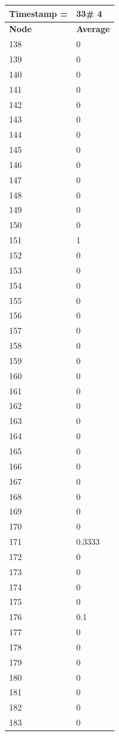 \begin{tabular}{|l||l|}
\hline
\textbf{Timestamp =} & \textbf{33}\# 4\\\hline
	\textbf{Node} & \textbf{Average} \\ \hline
\hline
	138 & 0 \\ \hline
	139 & 0 \\ \hline
	140 & 0 \\ \hline
	141 & 0 \\ \hline
	142 & 0 \\ \hline
	143 & 0 \\ \hline
	144 & 0 \\ \hline
	145 & 0 \\ \hline
	146 & 0 \\ \hline
	147 & 0 \\ \hline
	148 & 0 \\ \hline
	149 & 0 \\ \hline
	150 & 0 \\ \hline
	151 & 1 \\ \hline
	152 & 0 \\ \hline
	153 & 0 \\ \hline
	154 & 0 \\ \hline
	155 & 0 \\ \hline
	156 & 0 \\ \hline
	157 & 0 \\ \hline
	158 & 0 \\ \hline
	159 & 0 \\ \hline
	160 & 0 \\ \hline
	161 & 0 \\ \hline
	162 & 0 \\ \hline
	163 & 0 \\ \hline
	164 & 0 \\ \hline
	165 & 0 \\ \hline
	166 & 0 \\ \hline
	167 & 0 \\ \hline
	168 & 0 \\ \hline
	169 & 0 \\ \hline
	170 & 0 \\ \hline
	171 & 0.3333 \\ \hline
	172 & 0 \\ \hline
	173 & 0 \\ \hline
	174 & 0 \\ \hline
	175 & 0 \\ \hline
	176 & 0.1 \\ \hline
	177 & 0 \\ \hline
	178 & 0 \\ \hline
	179 & 0 \\ \hline
	180 & 0 \\ \hline
	181 & 0 \\ \hline
	182 & 0 \\ \hline
	183 & 0 \\ \hline
\end{tabular}
